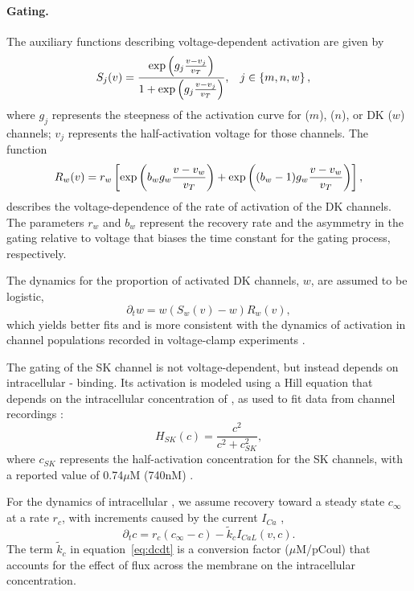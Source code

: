 \documentclass[12pt]{article}
\begin{document}
\paragraph{Gating.} 
The auxiliary functions describing voltage-dependent activation are given by
\begin{align}
S_j(v) &= \frac{\textrm{exp}\left(g_j \frac{v-v_j}{v_T} \right)}{1 + \textrm{exp}\left(g_j \frac{v-v_j}{v_T} \right)}, \hspace{0.3cm} j \in \left\{m,n,w\right\}, 
\label{eq:gating}
\end{align}
where $g_j$ represents the steepness of the activation curve for \Na ($m$), \Ca ($n$), or DK ($w$) channels; $v_j$ represents the half-activation voltage for those channels. 
The function
\begin{equation}
    R_w(v) = r_w \left[ \exp \left(b_w g_w\frac{v-v_w}{v_T}\right) + \exp \left((b_w-1)g_w\frac{v-v_w}{v_T}\right)\right],
\label{eq:actRate}
\end{equation}  
describes the voltage-dependence of the rate of activation of the DK channels. The parameters  $r_w$ and $b_w$ represent the recovery rate  and  the asymmetry in the gating relative to voltage that biases the time constant for the gating process, respectively. 

The dynamics for the proportion of activated DK channels, $w$,  are assumed to be logistic,
\begin{equation}
\partial_t{w} = w (S_w(v)-w)  R_w(v), \label{eq:dwdt}
\end{equation}
which yields better fits and is more consistent with the dynamics of activation in channel populations recorded in voltage-clamp experiments \citep{Covarrubiasetal1991,hodgkin1952quantitative,TsunodaSalkoff1995b}.

The gating of the SK channel is not voltage-dependent, but instead depends on intracellular \Ca- binding. Its activation is modeled using a Hill equation that depends on the intracellular concentration of \Ca, as used to fit data from channel recordings \citep{hirschberg1999gating}:
\begin{equation}
H_{SK}(c) = \frac{c^2}{c^2 + c_{SK}^2},
\end{equation}
where $c_{SK}$ represents the half-activation \Ca concentration for the SK channels, with a reported value of 0.74$\mu$M (740nM) \citep{hirschberg1998gating,stocker20042+}.

For the dynamics of intracellular {\Ca}, we assume recovery toward a steady state $c_{\infty}$ at a rate $r_c$, with increments caused by the {\Ca} current $I_{Ca}$ \citep{avron1991minimal},
\begin{equation}
\partial_t{c} = r_{c}({c_{\infty} - c}) - \tilde{k}_{c} I_{CaL}(v,c).
\label{eq:dcdt}
\end{equation}
The term $\tilde{k}_c$ in equation~\eqref{eq:dcdt} is a conversion factor ($\mu$M/pCoul) that accounts for the effect of {\Ca} flux across the membrane on the intracellular {\Ca} concentration. 
\end{document}
